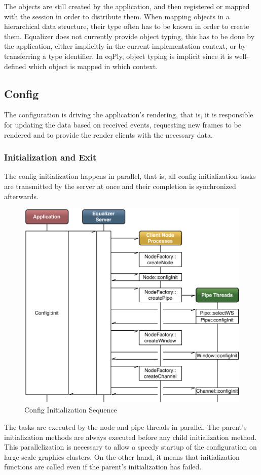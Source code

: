 \documentclass[10pt,a4]{scrartcl}
\begin{document}
The objects are still created by the application, and then registered or
mapped with the session in order to distribute them. When mapping
objects in a hierarchical data structure, their type often has to be
known in order to create them. Equalizer does not currently provide
object typing, this has to be done by the application, either implicitly
in the current implementation context, or by transferring a type
identifier. In \textsf{eqPly}, object typing is implicit since it is
well-defined which object is mapped in which context.


\subsection{Config}

The configuration is driving the application's rendering, that is, it is
responsible for updating the data based on received events, requesting
new frames to be rendered and to provide the render clients with the
necessary data.

\subsubsection{Initialization and Exit}

The config initialization happens in parallel, that is, all config
initialization tasks are transmitted by the server at once and their
completion is synchronized afterwards. 

\begin{figure}
  \includegraphics[width=.618\textwidth]{images/configInit.pdf}
  {\caption{\small\label{fConfigInit}Config Initialization Sequence}}
\end{figure}
The tasks are executed by the node and pipe threads in parallel. The
parent's initialization methods are always executed before any child
initialization method. This parallelization is necessary to allow a
speedy startup of the configuration on large-scale graphics clusters. On
the other hand, it means that initialization functions are called even
if the parent's initialization has failed.
\end{document}
